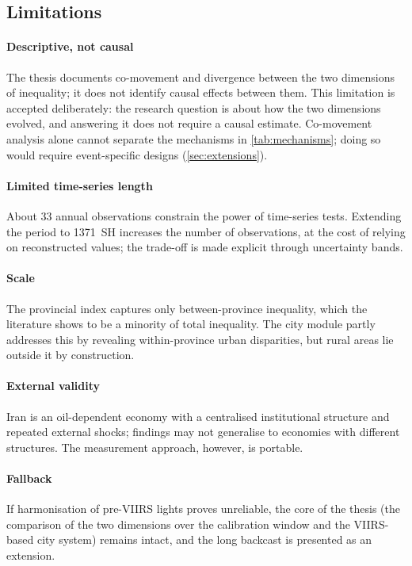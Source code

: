 \documentclass[11pt,a4paper]{article}
\begin{document}
\subsection{Limitations}

\paragraph{Descriptive, not causal}
The thesis documents co-movement and divergence between the two dimensions of inequality; it does not identify causal effects between them. This limitation is accepted deliberately: the research question is about how the two dimensions evolved, and answering it does not require a causal estimate. Co-movement analysis alone cannot separate the mechanisms in \cref{tab:mechanisms}; doing so would require event-specific designs (\cref{sec:extensions}).

\paragraph{Limited time-series length}
About 33 annual observations constrain the power of time-series tests. Extending the period to 1371~SH increases the number of observations, at the cost of relying on reconstructed values; the trade-off is made explicit through uncertainty bands.

\paragraph{Scale}
The provincial index captures only between-province inequality, which the literature shows to be a minority of total inequality. The city module partly addresses this by revealing within-province urban disparities, but rural areas lie outside it by construction.

\paragraph{External validity}
Iran is an oil-dependent economy with a centralised institutional structure and repeated external shocks; findings may not generalise to economies with different structures. The measurement approach, however, is portable.

\paragraph{Fallback}
If harmonisation of pre-VIIRS lights proves unreliable, the core of the thesis (the comparison of the two dimensions over the calibration window and the VIIRS-based city system) remains intact, and the long backcast is presented as an extension.
\end{document}
